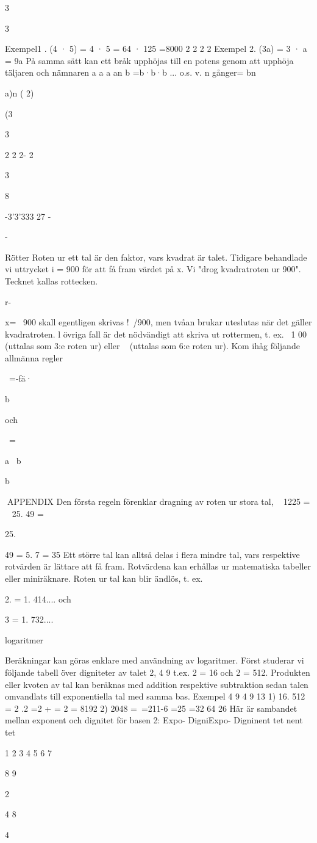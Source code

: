 \documentclass[a4paper,twoside,twocolumn,openright]{book}
\begin{document}
{{{{{{3

3

Exempel1 . (4 · 5) = 4 · 5 = 64 · 125 =8000
2
2
2
2
Exempel 2. (3a) = 3 · a = 9a
På samma sätt kan ett bråk upphöjas till en
potens genom att upphöja täljaren och
nämnaren
a a a
an
b =b·b·b ... o.s. v. n gånger= bn

a)n
(
2)

(3

3

2 2 2- 2

3

8

-3'3'333 27
-

-

Rötter
Roten ur ett tal är den faktor, vars kvadrat är
talet.
Tidigare behandlade vi uttrycket i = 900 för
att få fram värdet på x. Vi "drog kvadratroten
ur 900".
Tecknet
kallas rottecken.

r-

x= ~900 skall egentligen skrivas !\ /900,
men tvåan brukar uteslutas när det gäller
kvadratroten. l övriga fall är det nödvändigt
att skriva ut rottermen, t. ex. ~1 00 (uttalas
som 3:e roten ur) eller ~ (uttalas som
6:e roten ur).
Kom ihåg följande allmänna regler

~=-fä·{b

och

~={a
~b {b

APPENDIX
Den första regeln förenklar dragning av roten ur stora tal,
~ 1225 = ~ 25. 49 = {25. {49 = 5. 7 = 35
Ett större tal kan alltså delas i flera mindre tal,
vars respektive rotvärden är lättare att få
fram. Rotvärdena kan erhållas ur matematiska tabeller eller miniräknare.
Roten ur tal kan blir ändlös, t. ex.
{2. = 1. 414.... och {3 = 1. 732....

logaritmer

Beräkningar kan göras enklare med användning av logaritmer.
Först studerar vi följande tabell över digniteter av talet 2,
4
9
t.ex. 2 = 16 och 2 = 512.
Produkten eller kvoten av tal kan beräknas
med addition respektive subtraktion sedan
talen omvandlats till exponentiella tal med
samma bas.
Exempel
4
9
4 9
13
1) 16. 512 = 2 .2 =2 + = 2 = 8192
2) 2048 =~=211-6 =25 =32
64
26
Här är sambandet mellan exponent och dignitet för basen 2:
Expo- DigniExpo- Digninent
tet
nent
tet

1
2
3
4
5
6
7

8
9

2

4
8

4

}}}}}}}}}}}}}
\end{document}
